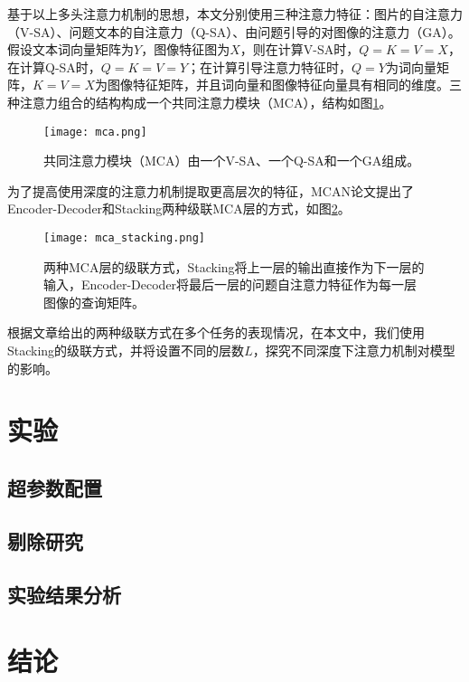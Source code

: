 基于以上多头注意力机制的思想，本文分别使用三种注意力特征：图片的自注意力（V-SA）、问题文本的自注意力（Q-SA）、由问题引导的对图像的注意力（GA）。假设文本词向量矩阵为$Y$，图像特征图为$X$，则在计算V-SA时，$Q = K = V = X$，在计算Q-SA时，$Q = K = V = Y$；在计算引导注意力特征时，$Q = Y$为词向量矩阵，$K = V = X$为图像特征矩阵，并且词向量和图像特征向量具有相同的维度。三种注意力组合的结构构成一个共同注意力模块（MCA），结构如图\ref{mca}。
\begin{figure}[H]
	\texttt{[image: mca.png]}
	\caption{共同注意力模块（MCA）由一个V-SA、一个Q-SA和一个GA组成。}
	\label{mca}
\end{figure}

为了提高使用深度的注意力机制提取更高层次的特征，MCAN论文提出了Encoder-Decoder和Stacking两种级联MCA层的方式，如图\ref{mca_stacking}。
\begin{figure}[H]
	\texttt{[image: mca\_stacking.png]}
	\caption{两种MCA层的级联方式，Stacking将上一层的输出直接作为下一层的输入，Encoder-Decoder将最后一层的问题自注意力特征作为每一层图像的查询矩阵。}
	\label{mca_stacking}
\end{figure}

根据文章给出的两种级联方式在多个任务的表现情况，在本文中，我们使用Stacking的级联方式，并将设置不同的层数$L$，探究不同深度下注意力机制对模型的影响。

\section{实验}
\subsection{超参数配置}
\subsection{剔除研究}
\subsection{实验结果分析}

\section{结论}
